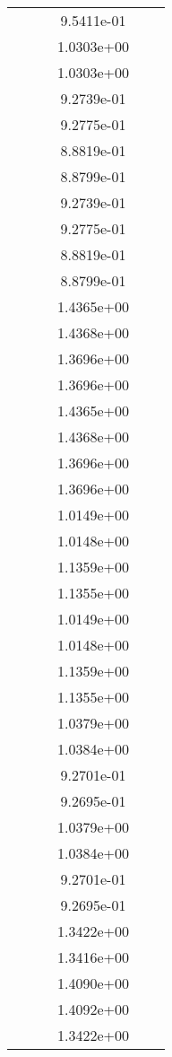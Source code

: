 \begin{xltabular}{\textwidth}{r|rS[table-format=1.3e+2]S[table-format=1.4e+2]S[table-format=1.4e+2]S[table-format=-1.5]}
&  &  & 9.5411e-01 & & \\
&  &  & 1.0303e+00 & & \\
&  &  & 1.0303e+00 & & \\
&  &  & 9.2739e-01 & & \\
&  &  & 9.2775e-01 & & \\
&  &  & 8.8819e-01 & & \\
&  &  & 8.8799e-01 & & \\
&  &  & 9.2739e-01 & & \\
&  &  & 9.2775e-01 & & \\
&  &  & 8.8819e-01 & & \\
&  &  & 8.8799e-01 & & \\
&  &  & 1.4365e+00 & & \\
&  &  & 1.4368e+00 & & \\
&  &  & 1.3696e+00 & & \\
&  &  & 1.3696e+00 & & \\
&  &  & 1.4365e+00 & & \\
&  &  & 1.4368e+00 & & \\
&  &  & 1.3696e+00 & & \\
&  &  & 1.3696e+00 & & \\
&  &  & 1.0149e+00 & & \\
&  &  & 1.0148e+00 & & \\
&  &  & 1.1359e+00 & & \\
&  &  & 1.1355e+00 & & \\
&  &  & 1.0149e+00 & & \\
&  &  & 1.0148e+00 & & \\
&  &  & 1.1359e+00 & & \\
&  &  & 1.1355e+00 & & \\
&  &  & 1.0379e+00 & & \\
&  &  & 1.0384e+00 & & \\
&  &  & 9.2701e-01 & & \\
&  &  & 9.2695e-01 & & \\
&  &  & 1.0379e+00 & & \\
&  &  & 1.0384e+00 & & \\
&  &  & 9.2701e-01 & & \\
&  &  & 9.2695e-01 & & \\
&  &  & 1.3422e+00 & & \\
&  &  & 1.3416e+00 & & \\
&  &  & 1.4090e+00 & & \\
&  &  & 1.4092e+00 & & \\
&  &  & 1.3422e+00 & & \\

\end{xltabular}
